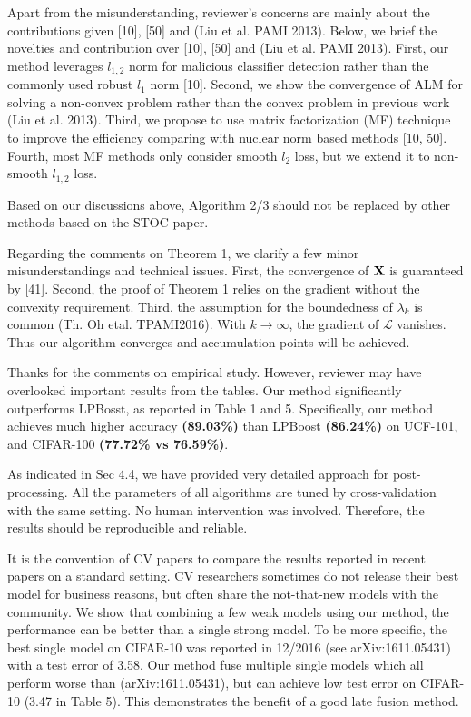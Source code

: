 \documentclass[10pt,twocolumn,letterpaper]{article}
\def\bX{\bf{X}}
\def\calL{\mathcal{L}}
\begin{document}
Apart from the misunderstanding, reviewer's concerns are mainly about the contributions given [10], [50] and (Liu et al. PAMI 2013).
Below, we brief the novelties and contribution over [10], [50] and (Liu et al. PAMI 2013).
First, our method leverages $l_{1,2}$ norm for malicious classifier detection rather than the commonly used robust $l_{1}$ norm [10].
Second, we show the convergence of ALM for solving a non-convex problem rather than the convex problem in previous work (Liu et al. 2013).
Third, we propose to use matrix factorization (MF) technique to improve the efficiency comparing with nuclear norm based methods [10, 50].
Fourth, most MF methods only consider smooth $l_{2}$ loss, but we extend it to non-smooth $l_{1,2}$ loss.

Based on our discussions above,
Algorithm 2/3 should not be replaced by other methods based on the STOC paper.

Regarding the comments on Theorem 1, we clarify a few minor misunderstandings and technical issues.
First, the convergence of $\bX$ is guaranteed by [41].
Second, the proof of Theorem 1 relies on the gradient without the convexity requirement.
Third, the assumption for the boundedness of $\lambda_k$ is common (Th. Oh etal. TPAMI2016).
With $k \rightarrow \infty$, the gradient of $\calL$ vanishes.
Thus our algorithm converges and accumulation points will be achieved.

Thanks for the comments on empirical study.
However, reviewer may have overlooked important results from the tables.
Our method significantly outperforms LPBosst, as reported in Table 1 and 5.
Specifically, our method achieves much higher accuracy \textbf{(89.03\%)} than LPBoost \textbf{(86.24\%)} on UCF-101,
and CIFAR-100 \textbf{(77.72\% vs 76.59\%)}.

As indicated in Sec 4.4, we have provided very detailed approach for post-processing.
All the parameters of all algorithms are tuned by cross-validation with the same setting.
No human intervention was involved.
Therefore, the results should be reproducible and reliable.


It is the convention of CV papers to compare the results reported in recent papers on a standard setting.
CV researchers sometimes do not release their best model for business reasons,
but often share the not-that-new models with the community.
We show that combining a few weak models using our method,
the performance can be better than a single strong model.
To be more specific, the best single model on CIFAR-10 was reported in 12/2016 (see arXiv:1611.05431) with a test error of 3.58.
Our method fuse multiple single models which all perform worse than (arXiv:1611.05431), but can achieve low test error on CIFAR-10 (3.47 in Table 5).
This demonstrates the benefit of a good late fusion method.
\end{document}
